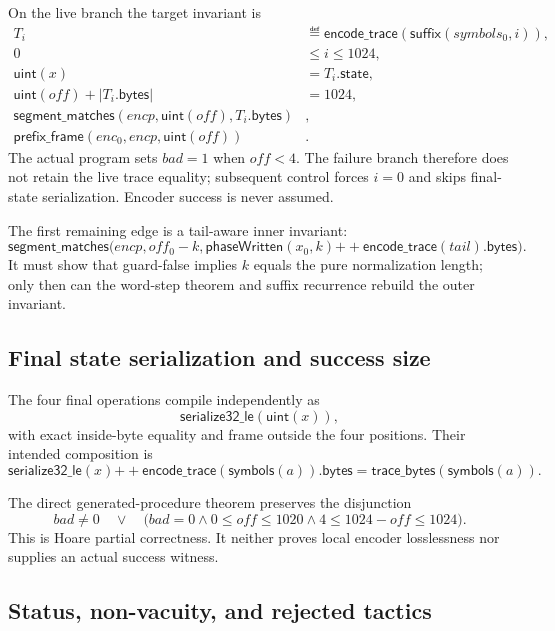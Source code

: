 On the live branch the target invariant is
\begin{align*}
 T_i&\eqdef \mathsf{encode\_trace}(\mathsf{suffix}(symbols_0,i)),\\
 0&\le i\le1024,\\
 \mathsf{uint}(x)&=T_i.\mathsf{state},\\
 \mathsf{uint}(off)+|T_i.\mathsf{bytes}|&=1024,\\
 \mathsf{segment\_matches}(encp,\mathsf{uint}(off),T_i.\mathsf{bytes})&,\\
 \mathsf{prefix\_frame}(enc_0,encp,\mathsf{uint}(off))&.
\end{align*}
The actual program sets $bad=1$ when $off<4$.  The failure branch therefore
does not retain the live trace equality; subsequent control forces $i=0$ and
skips final-state serialization.  Encoder success is never assumed.

The first remaining edge is a tail-aware inner invariant:
\[
 \mathsf{segment\_matches}\bigl(
   encp,off_0-k,
   \mathsf{phaseWritten}(x_0,k)\mathbin{++}
   \mathsf{encode\_trace}(tail).\mathsf{bytes}\bigr).
\]
It must show that guard-false implies $k$ equals the pure normalization length;
only then can the word-step theorem and suffix recurrence rebuild the outer
invariant.

\subsection*{Final state serialization and success size}

The four final  operations compile independently as
\[
  \mathsf{serialize32\_le}(\mathsf{uint}(x)),
\]
with exact inside-byte equality and frame outside the four positions.  Their
intended composition is
\[
 \mathsf{serialize32\_le}(x)\mathbin{++}
 \mathsf{encode\_trace}(\mathsf{symbols}(a)).\mathsf{bytes}
 =\mathsf{trace\_bytes}(\mathsf{symbols}(a)).
\]

The direct generated-procedure theorem
 preserves the disjunction
\[
 bad\ne0\quad\lor\quad
 \bigl(bad=0\land0\le off\le1020\land
   4\le1024-off\le1024\bigr).
\]
This is Hoare partial correctness. It neither proves local encoder
losslessness nor supplies an actual success witness.

\subsection*{Status, non-vacuity, and rejected tactics}

